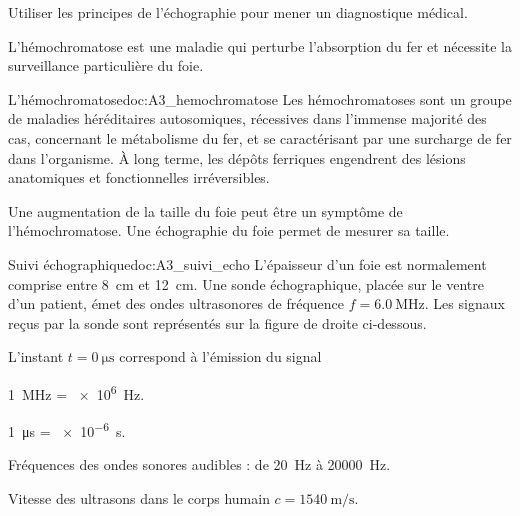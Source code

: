 \teteTermStssImag



\begin{objectifs}
  \item Utiliser les principes de l'échographie pour mener un diagnostique médical.
\end{objectifs}

\begin{contexte}
  L’hémochromatose est une maladie qui perturbe l’absorption du fer et nécessite la surveillance particulière du foie.

\end{contexte}


\begin{doc}{L'hémochromatose}{doc:A3_hemochromatose}
  Les hémochromatoses sont un groupe de maladies héréditaires autosomiques, 
  récessives dans l'immense majorité des cas,
  concernant le métabolisme du fer,
  et se caractérisant par une surcharge de fer dans l'organisme.
  À long terme, les dépôts ferriques engendrent des lésions anatomiques et fonctionnelles irréversibles.
  
  Une augmentation de la taille du foie peut être un symptôme de l'hémochromatose.
  Une échographie du foie permet de mesurer sa taille.
\end{doc}


\begin{doc}{Suivi échographique}{doc:A3_suivi_echo}
  L’épaisseur d’un foie est normalement comprise entre \qty{8}{\cm} et \qty{12}{\cm}.
  Une sonde échographique, placée sur le ventre d’un patient,
  émet des ondes  ultrasonores de fréquence $f = \qty{6,0}{\mega\hertz}$.
  Les signaux reçus par la sonde sont représentés sur la figure de droite ci-dessous.

  \begin{center}
  \end{center}
  
  L’instant $t = \qty{0}{\micro\s}$ correspond à l’émission du signal

  \begin{donnees}
    \item \qty{1}{\mega\hertz} = \qty{e6}{\hertz}.
    \item \qty{1}{\micro\s} = \qty{e-6}{\s}.
    \item Fréquences des ondes sonores audibles : de \qty{20}{\hertz} à \qty{20000}{\hertz}.
    \item Vitesse des ultrasons dans le corps humain $c = \qty{1540}{\m\per\s}$.
  \end{donnees}
\end{doc}


